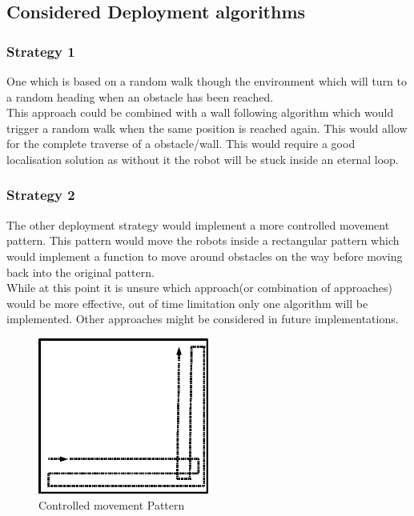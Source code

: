 \subsection{Considered Deployment algorithms}
\subsubsection{Strategy 1}
One which is based on a random walk though the environment which will turn to a random heading when an obstacle has been reached. \\
This approach could be combined with a wall following algorithm which would trigger a random walk when the same position is reached again. This would allow for the complete traverse of a obstacle/wall. This would require a good localisation solution as without it the robot will be stuck inside an eternal loop.\\
\subsubsection{Strategy 2}
The other deployment strategy would implement a more controlled movement pattern. This pattern would move the robots inside a rectangular pattern which would implement a function to move around obstacles on the way before moving back into the original pattern. \\[3ex]

While at this point it is unsure which approach(or combination of approaches) would be more effective, out of time limitation only one algorithm will be implemented. Other approaches might be considered in future implementations. 

\begin{figure}[h]
\centering
\includegraphics[width=0.5\textwidth]{../../figures/movement_pattern.png} 
\caption{Controlled movement Pattern}
\label{Figure 3}
\end{figure}

